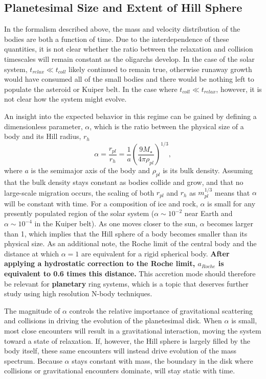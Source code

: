 \documentclass[twocolumn,linenumbers]{aastex63}
\begin{document}
\subsection{Planetesimal Size and Extent of Hill Sphere}\label{sec:sizeandhill}

In the formalism described above, the mass and velocity distribution
of the bodies are both a function of time. Due to the interdependence
of these quantities, it is not clear whether the ratio between the relaxation and collision timescales will remain constant as the
oligarchs develop. In the case of the solar system, $t_{relax} \ll t_{coll}$ likely continued to remain true, otherwise runaway 
growth would have consumed all of the small bodies and there would be nothing left to populate the asteroid or Kuiper belt. In 
the case where $t_{coll} \ll t_{relax}$, however, it is not clear how the system might evolve.

An insight into the expected behavior in this regime can be gained by
defining a dimensionless parameter, $\alpha$, which is the ratio
between the physical size of a body and its Hill radius, $r_{h}$
\begin{equation}\label{eq:alpha}
	\alpha = \frac{r_{pl}}{r_{h}} = \frac{1}{a} \left( \frac{9 M_{\star}}{4 \pi \rho_{pl}} \right)^{1/3},
\end{equation}
where $a$ is the semimajor axis of the body and $\rho_{pl}$ is its
bulk density. Assuming that the bulk density stays constant as bodies collide and
grow, and that no large-scale migration occurs, the scaling of both
$r_{pl}$ and $r_{h}$ as $m_{pl}^{1/3}$ means that $\alpha$ will be
constant with time. For a composition of ice and rock, $\alpha$ is
small for any presently populated region of the solar system ($\alpha \sim
10^{-2}$ near Earth and $\alpha \sim 10^{-4}$ in the Kuiper belt). As
one moves closer to the sun, $\alpha$ becomes larger than 1, which
implies that the Hill sphere of a body becomes smaller than its physical size.
As an additional note, the Roche limit of the central body and the distance at which $\alpha = 1$ are equivalent for a rigid spherical body. \textbf{After applying a hydrostatic correction to the Roche limit, $a_{Roche}$ is equivalent to 0.6 times this distance.} This accretion mode should therefore be relevant for \textbf{planetary} ring systems, which is a topic that deserves further study using high resolution N-body techniques.

The magnitude of $\alpha$ controls the relative importance of gravitational scattering and collisions in driving the evolution of the planetesimal disk. When $\alpha$ is small, most close encounters will result in a gravitational interaction, moving the system toward a state of relaxation. If, however, the Hill sphere is largely filled by the body itself, these same encounters will instead drive evolution of the mass spectrum. Because $\alpha$ stays constant with mass, the boundary in the disk where collisions or gravitational encounters dominate, will stay static with time.
\end{document}

